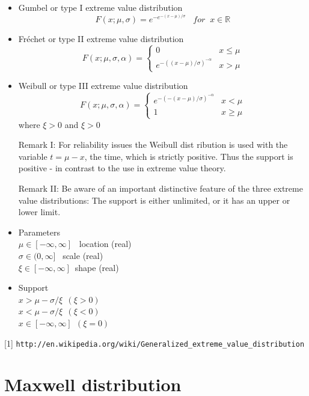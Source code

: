\begin{itemize}
\item Gumbel or type I extreme value distribution
$$
   F(x;\mu,\sigma)=e^{-e^{-(x-\mu)/\sigma}}\;\;\; for\;\; x\in\mathbb R
$$
\item Fr\'{e}chet or type II extreme value distribution
$$
    F(x;\mu,\sigma,\alpha)=\begin{cases} 0 & x\leq \mu \\ e^{-((x-\mu)/\sigma)^{-\alpha}} & x>\mu \end{cases}
$$

\item Weibull or type III extreme value distribution
$$
    F(x;\mu,\sigma,\alpha)=\begin{cases} e^{-(-(x-\mu)/\sigma)^{-\alpha}} & x<\mu \\ 1 & x\geq \mu \end{cases}
$$
where $\xi > 0$ and $\xi > 0$

Remark I: For reliability issues the Weibull dist ribution is used
with the variable $t = \mu - x$, the time, which is strictly
positive. Thus the support is positive - in contrast to the use in
extreme value theory.

Remark II: Be aware of an important distinctive feature of the
three extreme value distributions: The support is either
unlimited, or it has an upper or lower limit.
\end{itemize}
\begin{itemize}
\item Parameters\\
  $\mu \in [-\infty,\infty]$ \, location (real)\\
  $\sigma \in (0,\infty]$ \, scale (real)\\
  $\xi\in [-\infty,\infty]$\, shape (real)
\item Support\\
  $x>\mu-\sigma/\xi\,\;(\xi > 0)$ \\
  $x<\mu-\sigma/\xi\,\;(\xi < 0)$ \\
  $x \in [-\infty,\infty]\,\;(\xi = 0)$
\end{itemize}
[1]
\verb"http://en.wikipedia.org/wiki/Generalized_extreme_value_distribution"


\clearpage
\section{Maxwell distribution}

